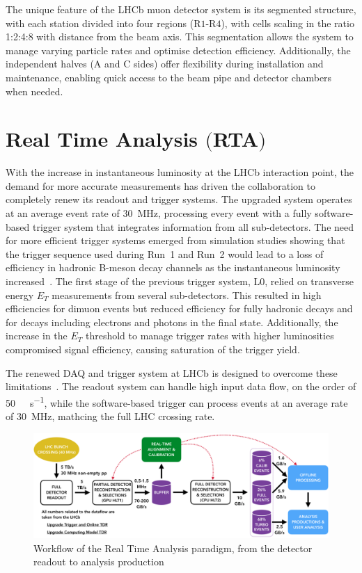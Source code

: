 The unique feature of the LHCb muon detector system is its segmented structure, with each station divided into four regions (R$1$-R$4$), with cells scaling in the ratio 1:2:4:8 with distance from the beam axis. This segmentation allows the system to manage varying particle rates and optimise detection efficiency. Additionally, the independent halves (A and C sides) offer flexibility during installation and maintenance, enabling quick access to the beam pipe and detector chambers when needed.


\section[Real Time Analysis]{Real Time Analysis $\bigl($RTA$\bigr)$}\label{sec:rta}

With the increase in instantaneous luminosity at the LHCb interaction point, the demand for more accurate measurements has driven the collaboration to completely renew its readout and trigger systems. The upgraded system operates at an average event rate of \SI{30}{\mega\hertz}, processing every event with a fully software-based trigger system that integrates information from all sub-detectors. The need for more efficient trigger systems emerged from simulation studies showing that the trigger sequence used during Run~1 and Run~2 would lead to a loss of efficiency in hadronic B-meson decay channels as the instantaneous luminosity increased~\cite{CERN-LHCC-2011-001}. The first stage of the previous trigger system, L$0$, relied on transverse energy $E_T$ measurements from several sub-detectors. This resulted in high efficiencies for dimuon events but reduced efficiency for fully hadronic decays and for decays including electrons and photons in the final state. Additionally, the increase in the $E_T$ threshold to manage trigger rates with higher luminosities compromised signal efficiency, causing saturation of the trigger yield.

The renewed DAQ and trigger system at LHCb is designed to overcome these limitations~\cite{CERN-LHCC-2018-014}. The readout system can handle high input data flow, on the order of \SI[per-mode=symbol]{50}{\tera\byte\per\second}, while the software-based trigger can process events at an average rate of \SI{30}{\mega\hertz}, mathcing the full LHC crossing rate.

\begin{figure}
    \centering
    \includegraphics[width=\textwidth]{figures/hidef_RTA_dataflow_widescreen.png}
    \caption{Workflow of the Real Time Analysis paradigm, from the detector readout to analysis production}
    \label{fig:RTA}
\end{figure}

